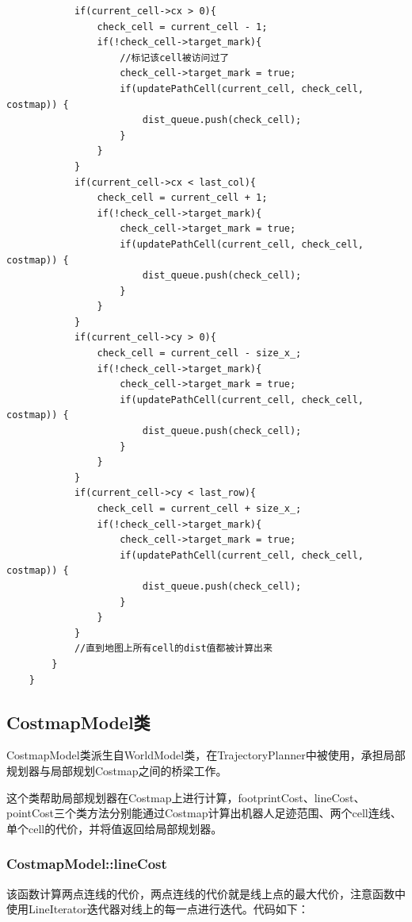 \documentclass[9pt, oneside]{book}
\begin{document}
\begin{verbatim}
            if(current_cell->cx > 0){
                check_cell = current_cell - 1;
                if(!check_cell->target_mark){
                    //标记该cell被访问过了
                    check_cell->target_mark = true;
                    if(updatePathCell(current_cell, check_cell, costmap)) {
                        dist_queue.push(check_cell);
                    }
                }
            }
            if(current_cell->cx < last_col){
                check_cell = current_cell + 1;
                if(!check_cell->target_mark){
                    check_cell->target_mark = true;
                    if(updatePathCell(current_cell, check_cell, costmap)) {
                        dist_queue.push(check_cell);
                    }
                }
            }
            if(current_cell->cy > 0){
                check_cell = current_cell - size_x_;
                if(!check_cell->target_mark){
                    check_cell->target_mark = true;
                    if(updatePathCell(current_cell, check_cell, costmap)) {
                        dist_queue.push(check_cell);
                    }
                }
            }
            if(current_cell->cy < last_row){
                check_cell = current_cell + size_x_;
                if(!check_cell->target_mark){
                    check_cell->target_mark = true;
                    if(updatePathCell(current_cell, check_cell, costmap)) {
                        dist_queue.push(check_cell);
                    }
                }
            }
            //直到地图上所有cell的dist值都被计算出来
        }
    }
\end{verbatim}
\normalsize

\subsection{CostmapModel类}

CostmapModel类派生自WorldModel类，在TrajectoryPlanner中被使用，承担局部规划器与局部规划Costmap之间的桥梁工作。

这个类帮助局部规划器在Costmap上进行计算，footprintCost、lineCost、pointCost三个类方法分别能通过Costmap计算出机器人足迹范围、两个cell连线、单个cell的代价，并将值返回给局部规划器。

\subsubsection{CostmapModel::lineCost}

该函数计算两点连线的代价，两点连线的代价就是线上点的最大代价，注意函数中使用LineIterator迭代器对线上的每一点进行迭代。代码如下：
\end{document}
